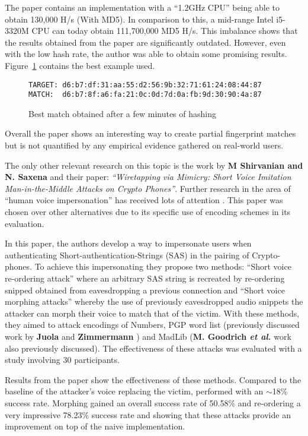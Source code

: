 The paper contains an implementation with a ``1.2GHz CPU'' being able to obtain 130,000 H/s (With MD5). In comparison to this, a mid-range Intel i5-3320M CPU can today obtain 111,700,000 MD5 H/s. This imbalance shows that the results obtained from the paper are significantly outdated. However, even with the low hash rate, the author was able to obtain some promising results. Figure~\ref{ref:fuzz} contains the best example used.

\begin{figure}[!h]
    \centering
    \verb|TARGET: d6:b7:df:31:aa:55:d2:56:9b:32:71:61:24:08:44:87|
    \verb|MATCH:  d6:b7:8f:a6:fa:21:0c:0d:7d:0a:fb:9d:30:90:4a:87|
    \caption{Best match obtained after a few minutes of hashing}
    \label{ref:fuzz}
\end{figure}

Overall the paper shows an interesting way to create partial fingerprint matches but is not quantified by any empirical evidence gathered on real-world users. 

The only other relevant research on this topic is the work by \textbf{M Shirvanian and N. Saxena}\cite{shirvanian2014wiretapping} 
and their paper: \textit{``Wiretapping via Mimicry: Short 
Voice Imitation Man-in-the-Middle Attacks on Crypto 
Phones''}. Further research in the area of ``human voice impersonation'' has received lots of attention \cite{mukhopadhyay2015all}\cite{chen2017you}\cite{wu2015spoofing}. This paper was chosen over other alternatives due to its specific use of encoding schemes in its evaluation.

In this paper, the authors develop a way to 
impersonate users when authenticating 
Short-authentication-Strings (SAS) in the pairing of 
Crypto-phones. To achieve this impersonating they propose 
two methods: ``Short voice re-ordering attack'' where an 
arbitrary SAS string is recreated by re-ordering snipped 
obtained from eavesdropping a previous connection
and ``Short voice morphing attacks'' whereby the use of 
previously eavesdropped audio snippets the attacker can
morph their voice to match that of the victim. With 
these methods, they aimed to attack encodings of Numbers, 
PGP word list (previously discussed work by \textbf{Juola} and 
\textbf{Zimmermann} \cite{juola1996whole}) and MadLib (\textbf{M. Goodrich 
\textit{et al.}}\cite{goodrich2006loud} work also 
previously discussed). The effectiveness of these attacks 
was evaluated with a study involving 30 participants.

Results from the paper show the effectiveness of these 
methods. Compared to the baseline of the attacker's voice 
replacing the victim, performed with an $\sim$18\% success rate. Morphing gained an overall success rate of 50.58\% and re-ordering a very impressive 78.23\% success rate and showing that these attacks provide an improvement on top of the naive implementation.

